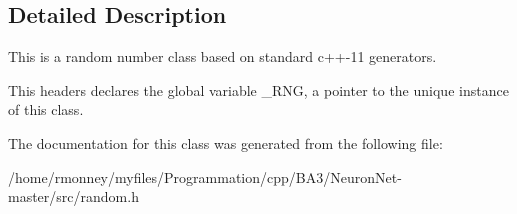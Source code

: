 \subsection{Detailed Description}
This is a random number class based on standard c++-\/11 generators.

This headers declares the global variable \+\_\+\+R\+NG, a pointer to the unique instance of this class. 

The documentation for this class was generated from the following file\+:\begin{DoxyCompactItemize}
\item 
/home/rmonney/myfiles/\+Programmation/cpp/\+B\+A3/\+Neuron\+Net-\/master/src/random.\+h\end{DoxyCompactItemize}
